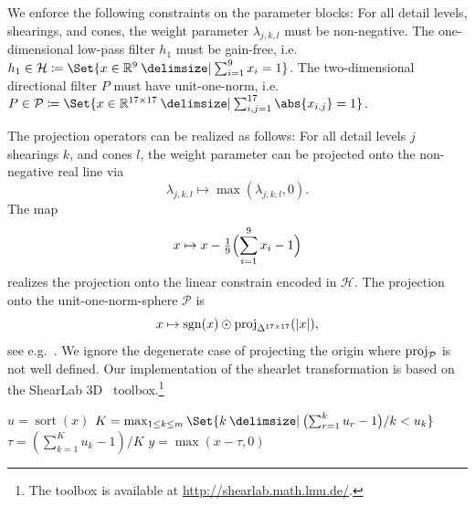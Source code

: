We enforce the following constraints on the parameter blocks:
For all detail levels, shearings, and cones, the weight parameter \( \lambda_{j,k,l} \) must be non-negative.
The one-dimensional low-pass filter \( h_{\num{1}} \) must be gain-free, i.e. \( h_{\num{1}} \in \mathcal{H} \coloneqq \Set{x \in \R^{\num{9}} \given \sum_{i=\num{1}}^{\num{9}} x_i = \num{1}} \).
The two-dimensional directional filter \( P \) must have unit-one-norm, i.e. \( P \in \mathcal{P} \coloneqq \Set{x \in \R^{\numproduct{17x17}} \given \sum_{i,j=\num{1}}^{\num{17}} \abs{x_{i, j}} = \num{1}} \).

The projection operators can be realized as follows:
For all detail levels \( j \) shearings \( k \), and cones \( l \), the weight parameter can be projected onto the non-negative real line via
\begin{equation}
	\lambda_{j, k, l} \mapsto \max (\lambda_{j, k, l}, \num{0}).
\end{equation}
The map
\begin{equation}
	x \mapsto x - \tfrac{1}{9}\Bigl(\sum_{i=\num{1}}^{\num{9}} x_i - \num{1} \Bigr)
\end{equation}
realizes the projection onto the linear constrain encoded in \( \mathcal{H} \).
The projection onto the unit-one-norm-sphere \( \mathcal{P} \) is
\begin{equation}
	x \mapsto \operatorname{sgn}(x) \odot \proj_{\Simplex^{\numproduct{17x17}}}(|x|),
\end{equation}
see e.g.~\cite[proposition 2.1]{Condat2015}.
We ignore the degenerate case of projecting the origin where \( \operatorname{proj}_{\mathcal{P}} \) is not well defined.
Our implementation of the shearlet transformation is based on the ShearLab 3D~\cite{kutyniok_shearlab_2016} toolbox.\footnote{The toolbox is available at \url{http://shearlab.math.lmu.de/}.}
\begin{algorithm}[t]
	\DontPrintSemicolon
	\( u = \operatorname{sort}(x) \)
	\( K = \max_{\num{1}\leq k \leq m} \Set{k \given \bigl( \sum_{r=\num{1}}^k u_r - \num{1} \bigr) / k < u_k} \)\;
	\( \tau = (\sum_{k=\num{1}}^K u_k - \num{1}) / K \)\;
	\( y = \max(x - \tau, \num{0}) \)
	\caption{%
		Simplex projection from~\cite{Held1974}.
	}%
	\label{alg:simplex proj}
\end{algorithm}

